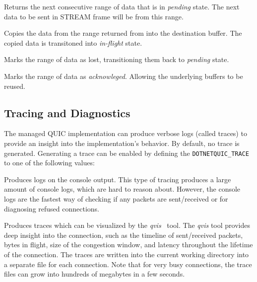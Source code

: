 \begin{description}

     Returns the next
consecutive range of data that is in \textit{pending} state. The next data to be sent in STREAM{}
frame will be from this range.

     Copies the data from the
range returned from  into the destination buffer. The copied data is
transitoned into \textit{in-flight} state.

     Marks the range of data as
lost, transitioning them back to \textit{pending} state.

     Marks the range
of data as \textit{acknowleged}. Allowing the underlying buffers to be reused.

\end{description}

\subsection{Tracing and Diagnostics}

The managed QUIC implementation can produce verbose logs (called traces) to provide an insight into
the implementation's behavior. By default, no trace is generated. Generating a trace can be enabled
by defining the \texttt{DOTNETQUIC_TRACE} to one of the following values:

\begin{description}

     Produces logs on the console output. This type of tracing produces a
large amount of console logs, which are hard to reason about. However, the console logs are the
fastest way of checking if any packets are sent/received or for diagnosing refused connections.

 Produces traces which can be visualized by the \textit{qvis}~\cite{web:qvis}
tool. The \textit{qvis} tool provides deep insight into the connection, such as the timeline of
sent/received packets, bytes in flight, size of the congestion window, and latency throughout the
lifetime of the connection. The traces are written into the current working directory into a
separate file for each connection. Note that for very busy connections, the trace files can grow
into hundreds of megabytes in a few seconds.

\end{description}

